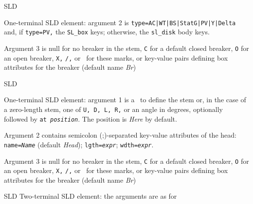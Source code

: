 %
  {SLD}%
  {One-terminal SLD element: argument 2 is
   {\tt type=AC|WT|BS|StatG|PV|Y|Delta} and,
   if {\tt type=PV,} the {\tt SL\_box} keys;
   otherwise, the {\tt sl\_disk} body keys.

   Argument 3 is null for no breaker in the stem, {\tt C} for a default
   closed breaker, {\tt O} for an open breaker, {\tt X,} {\tt /,} or \bsl\ for
   these marks, or
   key-value pairs defining box attributes for the breaker
   (default name {\sl Br})
   }%
%
  {SLD}%
  {One-terminal SLD element: argument 1 is a \linespec\ to define the stem
   or, in the case of a zero-length stem, one of {\tt U, D, L, R,} or an
   angle in degrees, optionally followed by {\tt at {\sl position}}.
   The position is {\sl Here} by default.

   Argument 2 contains semicolon (;)-separated key-value attributes
   of the head:
   {\tt name={\sl{}Name}} (default {\sl Head});
   {\tt lgth={\sl{}expr}};
   {\tt wdth={\sl{}expr}}.

   Argument 3 is null for no breaker in the stem, {\tt C} for a default
   closed breaker, {\tt O} for an open breaker, {\tt X,} {\tt /,} or \bsl\ for
   these marks, or
   key-value pairs defining box attributes for the breaker
   (default name {\sl Br})
   }%
%
  {SLD}%
  {Two-terminal SLD element: the arguments are as for 
   }%

